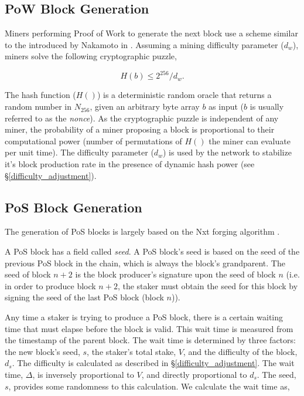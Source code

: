 \subsection{PoW Block Generation}
\label{pow_block_generation}

Miners performing Proof of Work to generate the next block use a scheme similar to the introduced by Nakamoto in \cite{nakamoto2008}. Assuming a mining difficulty parameter ($d_w$), miners solve the following cryptographic puzzle,

\begin{equation}
\label{eq:pow_puzzle_equation}
H(b) \leq 2^{256} / d_w.
\end{equation}

The hash function ($H()$) is a deterministic random oracle that returns a random number in $N_{256}$, given an arbitrary byte array $b$ as input ($b$ is usually referred to as the \textit{nonce}). As the cryptographic puzzle is independent of any miner, the probability of a miner proposing a block is proportional to their computational power (number of permutations of $H()$ the miner can evaluate per unit time). The difficulty parameter ($d_w$) is used by the network to stabilize it's block production rate in the presence of dynamic hash power (see \S\ref{difficulty_adjustment}).

\subsection{PoS Block Generation}
\label{pos_block_generation}

The generation of PoS blocks is largely based on the Nxt forging algorithm \cite{popov2016probabilistic}. 

A PoS block has a field called \emph{seed}. A PoS block's seed is based on the seed of the previous PoS block in the chain, which is always the block's grandparent. The seed of block $n + 2$ is the block producer's signature upon the seed of block $n$ (i.e. in order to produce block $n+2$, the staker must obtain the seed for this block by signing the seed of the last PoS block (block $n$)).  

Any time a staker is trying to produce a PoS block, there is a certain waiting time that must elapse before the block is valid. This wait time is measured from the timestamp of the parent block. The wait time is determined by three factors: the new block's seed, $s$, the staker's total stake, $V$, and the difficulty of the block, $d_s$. The difficulty is calculated as described in \S\ref{difficulty_adjustment}. The wait time, $\Delta$, is inversely proportional to $V$, and directly proportional to $d_s$. The seed, $s$, provides some randomness to this calculation. We calculate the wait time as,

